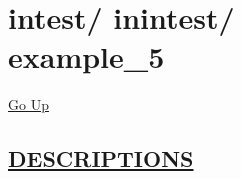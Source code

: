 \chapter*{\color{headfile}
{\large intest\slash\hspace{0pt}}
{\large inintest\slash\hspace{0pt}}
 \\
example_5
}
\hypertarget{ecldoc:toc:intest.inintest.example_5}{}
\hyperlink{ecldoc:toc:root/intest/inintest}{Go Up}


\section*{\underline{\textsf{DESCRIPTIONS}}}
